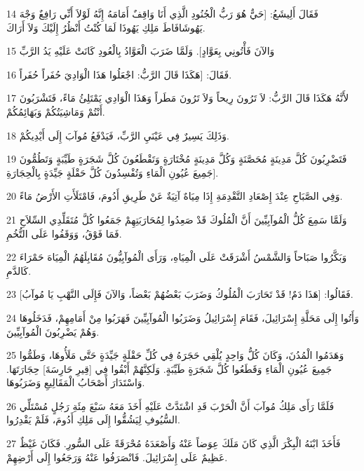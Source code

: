 \par 14 فَقَالَ أَلِيشَعُ: [حَيٌّ هُوَ رَبُّ الْجُنُودِ الَّذِي أَنَا وَاقِفٌ أَمَامَهُ إِنَّهُ لَوْلاَ أَنِّي رَافِعٌ وَجْهَ يَهُوشَافَاطَ مَلِكِ يَهُوذَا لَمَا كُنْتُ أَنْظُرُ إِلَيْكَ وَلاَ أَرَاكَ.
\par 15 وَالآنَ فَأْتُونِي بِعَوَّادٍ]. وَلَمَّا ضَرَبَ الْعَوَّادُ بِالْعُودِ كَانَتْ عَلَيْهِ يَدُ الرَّبِّ
\par 16 فَقَالَ: [هَكَذَا قَالَ الرَّبُّ: اجْعَلُوا هَذَا الْوَادِيَ حُفَراً حُفَراً.
\par 17 لأَنَّهُ هَكَذَا قَالَ الرَّبُّ: لاَ تَرُونَ رِيحاً وَلاَ تَرُونَ مَطَراً وَهَذَا الْوَادِي يَمْتَلِئُ مَاءً، فَتَشْرَبُونَ أَنْتُمْ وَمَاشِيَتُكُمْ وَبَهَائِمُكُمْ.
\par 18 وَذَلِكَ يَسِيرٌ فِي عَيْنَيِ الرَّبِّ، فَيَدْفَعُ مُوآبَ إِلَى أَيْدِيكُمْ.
\par 19 فَتَضْرِبُونَ كُلَّ مَدِينَةٍ مُحَصَّنَةٍ وَكُلَّ مَدِينَةٍ مُخْتَارَةٍ وَتَقْطَعُونَ كُلَّ شَجَرَةٍ طَيِّبَةٍ وَتَطُمُّونَ جَمِيعَ عُيُونِ الْمَاءِ وَتُفْسِدُونَ كُلَّ حَقْلَةٍ جَيِّدَةٍ بِالْحِجَارَةِ].
\par 20 وَفِي الصَّبَاحِ عِنْدَ إِصْعَادِ التَّقْدِمَةِ إِذَا مِيَاهٌ آتِيَةٌ عَنْ طَرِيقِ أَدُومَ، فَامْتَلَأَتِ الأَرْضُ مَاءً.
\par 21 وَلَمَّا سَمِعَ كُلُّ الْمُوآبِيِّينَ أَنَّ الْمُلُوكَ قَدْ صَعِدُوا لِمُحَارَبَتِهِمْ جَمَعُوا كُلَّ مُتَقَلِّدِي السِّلاَحِ فَمَا فَوْقُ، وَوَقَفُوا عَلَى التُّخُمِ.
\par 22 وَبَكَّرُوا صَبَاحاً وَالشَّمْسُ أَشْرَقَتْ عَلَى الْمِيَاهِ، وَرَأَى الْمُوآبِيُّونَ مُقَابِلَهُمُ الْمِيَاهَ حَمْرَاءَ كَالدَّمِ.
\par 23 فَقَالُوا: [هَذَا دَمٌ! قَدْ تَحَارَبَ الْمُلُوكُ وَضَرَبَ بَعْضُهُمْ بَعْضاً، وَالآنَ فَإِلَى النَّهْبِ يَا مُوآبُ].
\par 24 وَأَتُوا إِلَى مَحَلَّةِ إِسْرَائِيلَ، فَقَامَ إِسْرَائِيلُ وَضَرَبُوا الْمُوآبِيِّينَ فَهَرَبُوا مِنْ أَمَامِهِمْ، فَدَخَلُوهَا وَهُمْ يَضْرِبُونَ الْمُوآبِيِّينَ.
\par 25 وَهَدَمُوا الْمُدُنَ، وَكَانَ كُلُّ وَاحِدٍ يُلْقِي حَجَرَهُ فِي كُلِّ حَقْلَةٍ جَيِّدَةٍ حَتَّى مَلَأُوهَا، وَطَمُّوا جَمِيعَ عُيُونِ الْمَاءِ وَقَطَعُوا كُلَّ شَجَرَةٍ طَيِّبَةٍ. وَلَكِنَّهُمْ أَبْقُوا فِي [قِيرِ حَارِسَةَ] حِجَارَتَهَا. وَاسْتَدَارَ أَصْحَابُ الْمَقَالِيعِ وَضَرَبُوهَا.
\par 26 فَلَمَّا رَأَى مَلِكُ مُوآبَ أَنَّ الْحَرْبَ قَدِ اشْتَدَّتْ عَلَيْهِ أَخَذَ مَعَهُ سَبْعَ مِئَةِ رَجُلٍ مُسْتَلِّي السُّيُوفِ لِيَشُقُّوا إِلَى مَلِكِ أَدُومَ، فَلَمْ يَقْدِرُوا.
\par 27 فَأَخَذَ ابْنَهُ الْبِكْرَ الَّذِي كَانَ مَلَكَ عِوَضاً عَنْهُ وَأَصْعَدَهُ مُحْرَقَةً عَلَى السُّورِ. فَكَانَ غَيْظٌ عَظِيمٌ عَلَى إِسْرَائِيلَ. فَانْصَرَفُوا عَنْهُ وَرَجَعُوا إِلَى أَرْضِهِمْ.

